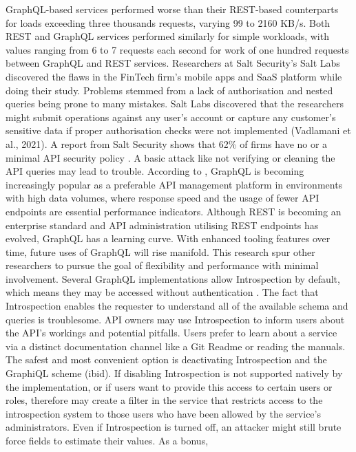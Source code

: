 GraphQL-based services performed worse than their REST-based counterparts for
loads exceeding three thousands requests, varying 99 to 2160 KB/s. Both
REST and GraphQL services performed similarly for simple workloads, with values
ranging from 6 to 7 requests each second for work of one hundred requests between
GraphQL and REST services. Researchers at Salt Security's Salt Labs discovered
the flaws in the FinTech firm's mobile apps and SaaS platform while doing their
study. Problems stemmed from a lack of authorisation and nested queries being
prone to many mistakes. Salt Labs discovered that the researchers might submit
operations against any user's account or capture any customer's sensitive data
if proper authorisation checks were not implemented (Vadlamani et al., 2021). A
report from Salt Security shows that 62\% of firms have no or a minimal
API security policy \citep{vadlamaniCanGraphQLReplace2021}. A basic attack like
not verifying or cleaning the API queries may lead to trouble. According to
\citet{britoRESTVsGraphQL2020}, GraphQL is becoming increasingly popular as a
preferable API management platform in environments with high data volumes, where
response speed and the usage of fewer API endpoints are essential performance
indicators. Although REST is becoming an enterprise standard and API
administration utilising REST endpoints has evolved, GraphQL has a learning
curve. With enhanced tooling features over time, future uses of GraphQL will
rise manifold. This research spur other researchers to pursue the goal of flexibility and performance with minimal involvement.
Several GraphQL implementations allow Introspection by default, which means they
may be accessed without authentication \citep{eizingerAPIDesignDistributed2017}.
The fact that Introspection enables the requester to understand all of the
available schema and queries is troublesome. API owners may use Introspection to
inform users about the API's workings and potential pitfalls. Users prefer to
learn about a service via a distinct documentation channel like a Git Readme or
reading the manuals. The safest and most convenient option is deactivating
Introspection and the GraphiQL scheme (ibid). If disabling Introspection is not
supported natively by the implementation, or if users want to provide this
access to certain users or roles, therefore may create a filter in the service
that restricts access to the introspection system to those users who have been
allowed by the service's administrators. Even if Introspection is turned off, an
attacker might still brute force fields to estimate their values. As a bonus,
